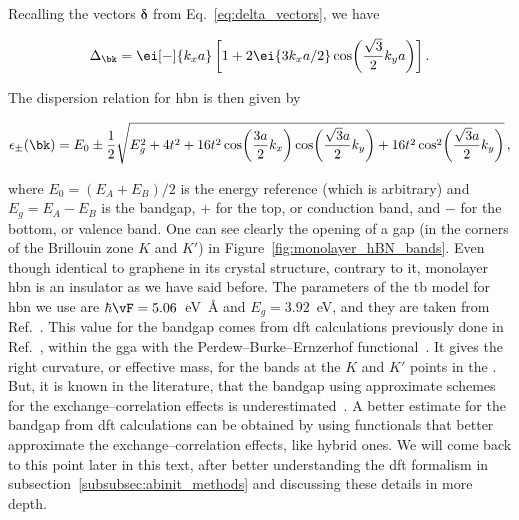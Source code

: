 \noindent Recalling the vectors $\boldsymbol{\delta}$ from Eq.~\eqref{eq:delta_vectors}, we have

\begin{equation}
    \label{eq:Delta_of_k}
    \Delta_{\bk} =\ei[-]{k_x a}\left[1+2 \ei{3 k_x a / 2} \cos\!\left(\frac{\sqrt{3}}{2} k_y a\right)\right].
\end{equation}

The dispersion relation for \gls{hbn} is then given by~\cite{ribeiro_stability_2011}

\begin{equation}
    \label{eq:hBN_dispersion_relation}
    \epsilon_{\pm}(\bk) = E_0 \pm \frac{1}{2} \sqrt{E^2_g + 4 t^2 + 16 t^2 \cos\! \left(\frac{3 a }{2} k_x\right) \cos\! \left(\frac{\sqrt{3} a}{2}  k_y \right) + 16 t^2 \cos^2\! \left(\frac{\sqrt{3} a}{2} k_y \right)}\,,
\end{equation}

\noindent where $E_0 = (E_A + E_B)/2$ is the energy reference (which is arbitrary) and $E_g = E_A - E_B$ is the bandgap, $+$ for the top, or conduction band, and $-$ for the bottom, or valence band.
One can see clearly the opening of a gap (in the corners of the Brillouin zone $K$ and $K'$) in Figure~\ref{fig:monolayer_hBN_bands}.
Even though identical to graphene in its crystal structure, contrary to it, monolayer \gls{hbn} is an insulator as we have said before.
The parameters of the \gls{tb} model for \gls{hbn} we use are $\hbar \vF= 5.06$~\unit{\electronvolt \angstrom} and $E_g = 3.92$~\unit{\electronvolt}, and they are taken from Ref.~\cite{ribeiro_stability_2011}.
This value for the bandgap comes from \gls{dft} calculations previously done in Ref.~\cite{ribeiro_stability_2011}, within the \gls{gga} with the Perdew--Burke--Ernzerhof functional~\cite{Perdew_1996}.
It gives the right curvature, or effective mass, for the bands at the $K$ and $K'$ points in the \bz.
But, it is known in the literature, that the bandgap using approximate schemes for the exchange--correlation effects is underestimated~\cite{Bagayoko_2014}.
A better estimate for the bandgap from \gls{dft} calculations can be obtained by using functionals that better approximate the exchange--correlation effects, like hybrid ones.
We will come back to this point later in this text, after better understanding the \gls{dft} formalism in subsection~\ref{subsubsec:abinit_methods} and discussing these details in more depth.

